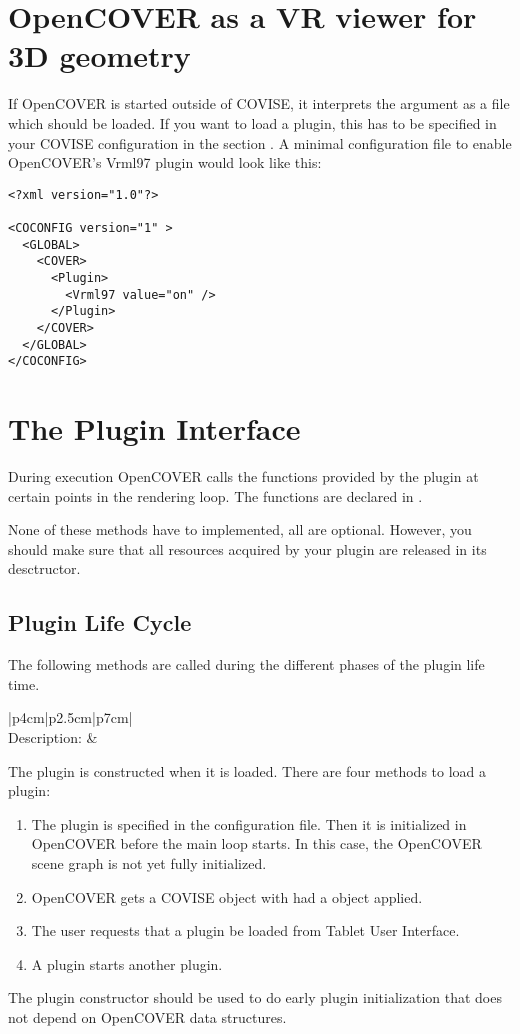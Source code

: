 \section{OpenCOVER as a VR viewer for 3D geometry}

If OpenCOVER is started outside of COVISE, it interprets the argument as a file which 
should be loaded. If you want to load a plugin, this has to be specified
in your COVISE configuration in the section .
A minimal configuration file to enable OpenCOVER's Vrml97 plugin would look like this:
\begin{verbatim}
<?xml version="1.0"?>

<COCONFIG version="1" >
  <GLOBAL>
    <COVER>
      <Plugin>
        <Vrml97 value="on" />
      </Plugin>
    </COVER>
  </GLOBAL>
</COCONFIG>
\end{verbatim}


\section{The Plugin Interface}

During execution OpenCOVER calls the functions provided by the plugin at certain 
points in the rendering loop. The functions are declared in . 

None of these methods have to implemented, all are optional.
However, you should make sure that all resources acquired by your plugin are released
in its desctructor.

\subsection{Plugin Life Cycle}

The following methods are called during the different phases of the plugin life time.

\begin{longtable}{|p{4cm}|p{2.5cm}|p{7cm}|}
\hline
{}
{\bf {}}\\
\hline
{Description:}  
  & 
  {The plugin is constructed when it is loaded.
   There are four methods to load a plugin:
   \begin{enumerate}
   \item The plugin is specified in the configuration file.
      Then it is initialized in OpenCOVER before the main loop starts.
      In this case, the OpenCOVER scene graph is not yet fully initialized.
   \item OpenCOVER gets a COVISE object with had a  object applied.
   \item The user requests that a plugin be loaded from  Tablet User Interface.
   \item A plugin starts another plugin.
   \end{enumerate}
   The plugin constructor should be used to do early plugin initialization that does
   not depend on OpenCOVER data structures.
  } \\
\hline
\end{longtable}


